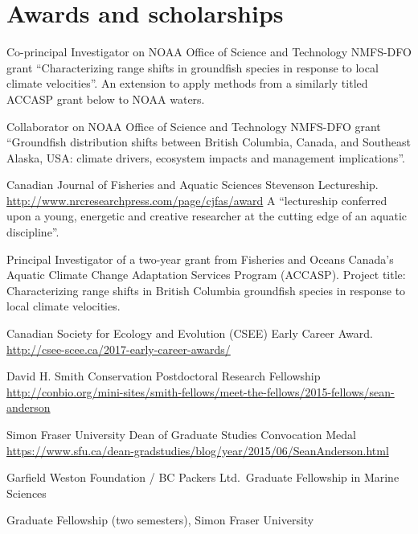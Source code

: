 \hypertarget{awards-and-scholarships}{%
\section{Awards and scholarships}\label{awards-and-scholarships}}

\begin{description}
\tightlist
\item[2020--21]
Co-principal Investigator on NOAA Office of Science and Technology
NMFS-DFO grant ``Characterizing range shifts in groundfish species in
response to local climate velocities''. An extension to apply methods
from a similarly titled ACCASP grant below to NOAA waters.
\item[2020--21]
Collaborator on NOAA Office of Science and Technology NMFS-DFO grant
``Groundfish distribution shifts between British Columbia, Canada, and
Southeast Alaska, USA: climate drivers, ecosystem impacts and management
implications''.
\item[2019]
Canadian Journal of Fisheries and Aquatic Sciences Stevenson
Lectureship. \url{http://www.nrcresearchpress.com/page/cjfas/award} A
``lectureship conferred upon a young, energetic and creative researcher
at the cutting edge of an aquatic discipline''.
\item[2018--20]
Principal Investigator of a two-year grant from Fisheries and Oceans
Canada's Aquatic Climate Change Adaptation Services Program (ACCASP).
Project title: Characterizing range shifts in British Columbia
groundfish species in response to local climate velocities.
\item[2017]
Canadian Society for Ecology and Evolution (CSEE) Early Career Award.\\
\url{http://csee-scee.ca/2017-early-career-awards/}
\item[2015]
David H. Smith Conservation Postdoctoral Research Fellowship\\
\url{http://conbio.org/mini-sites/smith-fellows/meet-the-fellows/2015-fellows/sean-anderson}
\item[2015]
Simon Fraser University Dean of Graduate Studies Convocation Medal\\
\url{https://www.sfu.ca/dean-gradstudies/blog/year/2015/06/SeanAnderson.html}
\item[2014]
Garfield Weston Foundation / BC Packers Ltd.\ Graduate Fellowship in
Marine Sciences
\item[2014]
Graduate Fellowship (two semesters), Simon Fraser University
\item[2012--13]

\end{description}
